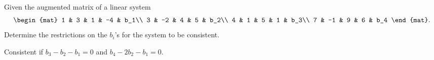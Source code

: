 
\begin{Exercise}[name={},
title={}, 
origin={\cite{YL}},
counter=Exercise]
Given the augmented matrix of a linear system
\[
\begin{mat}
1 & 3 & 1 & -4 & b_1\\
3 & -2 & 4 & 5 & b_2\\
4 & 1 & 5 &  1 & b_3\\
7 & -1 & 9 & 6 & b_4
\end{mat}.
\]
Determine the restrictions on the $b_i$'s for the system to be consistent.
\vspace{6in}
\end{Exercise}

\begin{Answer}
Consistent if $b_3-b_2-b_1=0$ and $b_4-2b_2-b_1=0$.
\end{Answer}


